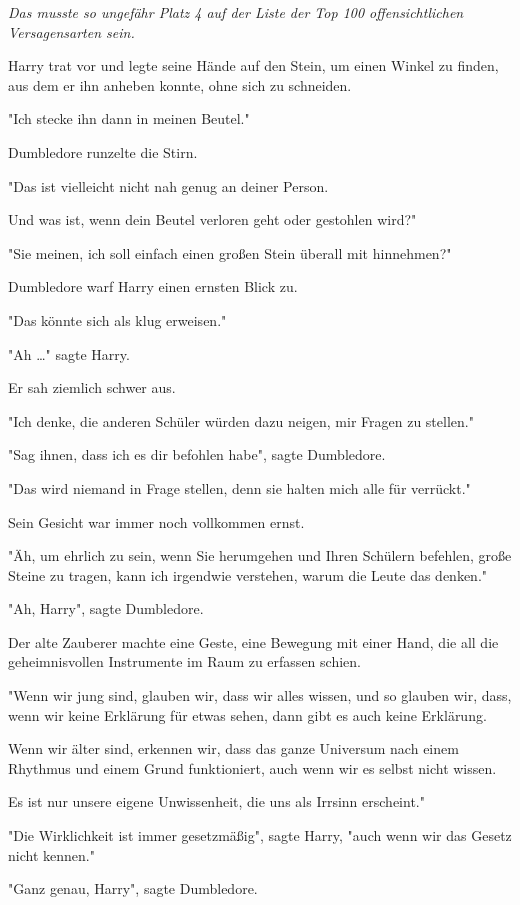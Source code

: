 {\emph{Das musste so ungefähr Platz 4 auf der Liste der Top 100 offensichtlichen Versagensarten sein.}

Harry trat vor und legte seine Hände auf den Stein, um einen Winkel zu finden, aus dem er ihn anheben konnte, ohne sich zu schneiden.

"Ich stecke ihn dann in meinen Beutel."

Dumbledore runzelte die Stirn.

"Das ist vielleicht nicht nah genug an deiner Person.

Und was ist, wenn dein Beutel verloren geht oder gestohlen wird?"

"Sie meinen, ich soll einfach einen großen Stein überall mit hinnehmen?"

Dumbledore warf Harry einen ernsten Blick zu.

"Das könnte sich als klug erweisen."

"Ah …" sagte Harry.

Er sah ziemlich schwer aus.

"Ich denke, die anderen Schüler würden dazu neigen, mir Fragen zu stellen."

"Sag ihnen, dass ich es dir befohlen habe", sagte Dumbledore.

"Das wird niemand in Frage stellen, denn sie halten mich alle für verrückt."

Sein Gesicht war immer noch vollkommen ernst.

"Äh, um ehrlich zu sein, wenn Sie herumgehen und Ihren Schülern befehlen, große Steine zu tragen, kann ich irgendwie verstehen, warum die Leute das denken."

"Ah, Harry", sagte Dumbledore.

Der alte Zauberer machte eine Geste, eine Bewegung mit einer Hand, die all die geheimnisvollen Instrumente im Raum zu erfassen schien.

"Wenn wir jung sind, glauben wir, dass wir alles wissen, und so glauben wir, dass, wenn wir keine Erklärung für etwas sehen, dann gibt es auch keine Erklärung.

Wenn wir älter sind, erkennen wir, dass das ganze Universum nach einem Rhythmus und einem Grund funktioniert, auch wenn wir es selbst nicht wissen.

Es ist nur unsere eigene Unwissenheit, die uns als Irrsinn erscheint."

"Die Wirklichkeit ist immer gesetzmäßig", sagte Harry, "auch wenn wir das Gesetz nicht kennen."

"Ganz genau, Harry", sagte Dumbledore.

}
